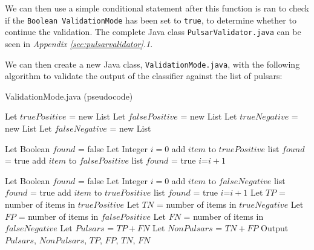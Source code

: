 \documentclass{article}
\begin{document}
We can then use a simple conditional statement after this function is ran to check if the \verb|Boolean ValidationMode| has been set to \verb|true|, to determine whether to continue the validation. The complete Java class \verb|PulsarValidator.java| can be seen in \emph{Appendix \ref{sec:pulsarvalidator}.1}.

We can then create a new Java class, \verb|ValidationMode.java|, with the following algorithm to validate the output of the classifier against the list of pulsars:

\begin{algorithm}[H]
    \caption{ValidationMode.java (pseudocode)}
    \begin{algorithmic}
        \State Let $truePositive$ = new List
        \State Let $falsePositive$ = new List
        \State Let $trueNegative$ = new List
        \State Let $falseNegative$ = new List
        
            \State Let Boolean $found$ = false
            \State Let Integer $i=0$
                    \State add $item$ to $truePositive$ list
                    \State $found$ = true
                    \State add $item$ to $falsePositive$ list
                    \State $found$ = true
                \Else
                    \State $i$=$i+1$
                \EndIf
            \EndWhile
        \EndFor

            \State Let Boolean $found$ = false
            \State Let Integer $i=0$
                    \State add $item$ to $falseNegative$ list
                    \State $found$ = true
                    \State add $item$ to $truePositive$ list
                    \State $found$ = true
                \Else
                    \State $i$=$i+1$
                \EndIf
            \EndWhile
        \EndFor
        \State Let $TP$ = number of items in $truePositive$
        \State Let $TN$ = number of items in $trueNegative$
        \State Let $FP$ = number of items in $falsePositive$
        \State Let $FN$ = number of items in $falseNegative$
        \State Let $Pulsars$ = $TP+FN$
        \State Let $NonPulsars$ = $TN+FP$
        \State Output $Pulsars$, $NonPulsars$, $TP$, $FP$, $TN$, $FN$
    \end{algorithmic}
\end{algorithm}
\end{document}
